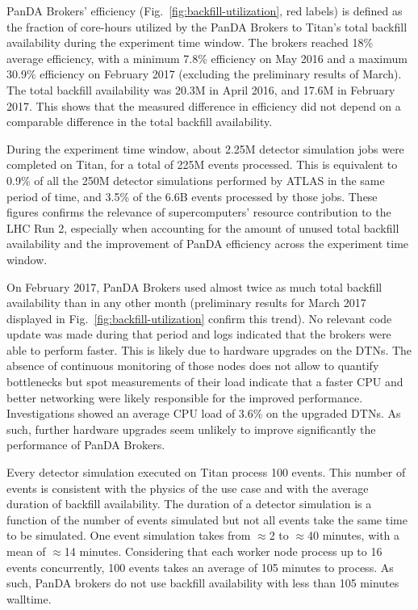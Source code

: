 PanDA Brokers' efficiency (Fig.~\ref{fig:backfill-utilization}, red labels)
is defined as the fraction of core-hours utilized by the PanDA Brokers to
Titan’s total backfill availability during the experiment time window. The
brokers reached 18\% average efficiency, with a minimum 7.8\% efficiency on
May 2016 and a maximum 30.9\% efficiency on February 2017 (excluding the
preliminary results of March). The total backfill availability was 20.3M in
April 2016, and 17.6M in February 2017. This shows that the measured
difference in efficiency did not depend on a comparable difference in the
total backfill availability.

During the experiment time window, about 2.25M detector simulation jobs were
completed on Titan, for a total of 225M events processed. This is equivalent
to 0.9\% of all the 250M detector simulations performed by ATLAS in the same
period of time, and 3.5\% of the 6.6B events processed by those jobs. These
figures confirms the relevance of supercomputers' resource contribution to
the LHC Run 2, especially when accounting for the amount of unused total
backfill availability and the improvement of PanDA efficiency across the
experiment time window.

On February 2017, PanDA Brokers used almost twice as much total backfill
availability than in any other month (preliminary results for March 2017
displayed in Fig.~\ref{fig:backfill-utilization} confirm this trend). No
relevant code update was made during that period and logs indicated that the
brokers were able to perform faster. This is likely due to hardware upgrades
on the DTNs. The absence of continuous monitoring of those nodes does not
allow to quantify bottlenecks but spot measurements of their load indicate
that a faster CPU and better networking were likely responsible for the
improved performance. Investigations showed an average CPU load of 3.6\% on
the upgraded DTNs. As such, further hardware upgrades seem unlikely to
improve significantly the performance of PanDA Brokers.

Every detector simulation executed on Titan process 100 events. This number
of events is consistent with the physics of the use case and with the average
duration of backfill availability. The duration of a detector simulation is a
function of the number of events simulated but not all events take the same
time to be simulated. One event simulation takes from $\approx$2 to
$\approx$40 minutes, with a mean of $\approx$14 minutes. Considering that
each worker node process up to 16 events concurrently, 100 events takes an
average of 105 minutes to process. As such, PanDA brokers do not use backfill
availability with less than 105 minutes walltime.

